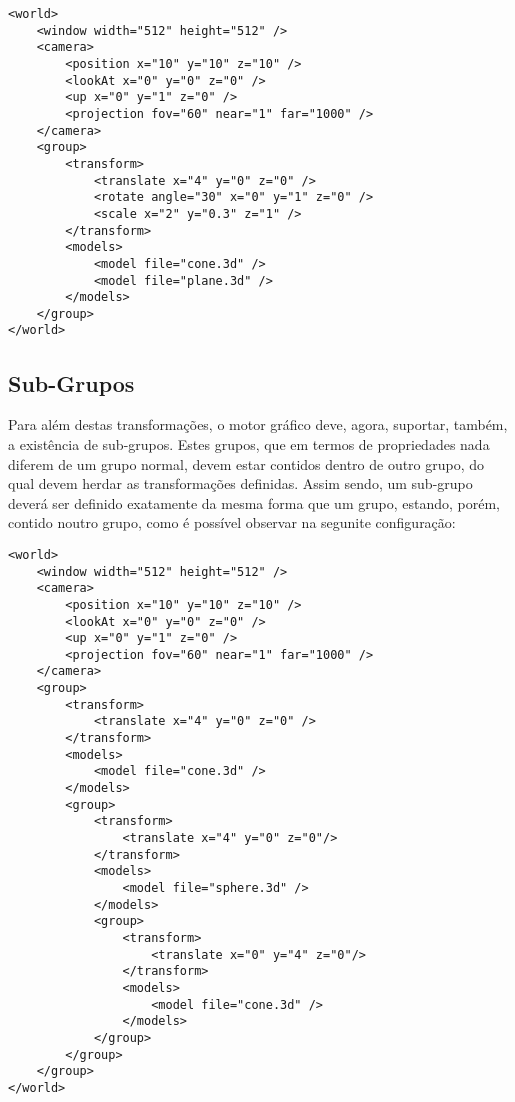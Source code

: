 \begin{tcolorbox}[
    colback=blue!10!white,
    colframe=black!50!black,
    after upper={\hfill\textbf{xml}}
]
\begin{verbatim}
<world>
    <window width="512" height="512" />
    <camera>
        <position x="10" y="10" z="10" />
        <lookAt x="0" y="0" z="0" />
        <up x="0" y="1" z="0" />
        <projection fov="60" near="1" far="1000" />
    </camera>
    <group>
        <transform>
            <translate x="4" y="0" z="0" />
            <rotate angle="30" x="0" y="1" z="0" />
            <scale x="2" y="0.3" z="1" />
        </transform>
        <models>
            <model file="cone.3d" />
            <model file="plane.3d" />
        </models>
    </group>
</world>
\end{verbatim}
\end{tcolorbox}

\subsection{Sub-Grupos}
Para além destas transformações, o motor gráfico deve,
agora, suportar, também, a existência de sub-grupos.
\newline
\break
\noindent
Estes grupos, que em termos de propriedades nada diferem
de um grupo normal, devem estar contidos dentro
de outro grupo, do qual devem herdar as transformações
definidas.
\newline
\break
\noindent
Assim sendo, um sub-grupo deverá ser definido exatamente
da mesma forma que um grupo, estando, porém, contido
noutro grupo, como é possível observar na segunite
configuração:
\newline

\begin{tcolorbox}[
    colback=blue!10!white,
    colframe=black!50!black,
    after upper={\hfill\textbf{xml}}
]
\begin{verbatim}
<world>
    <window width="512" height="512" />
    <camera>
        <position x="10" y="10" z="10" />
        <lookAt x="0" y="0" z="0" />
        <up x="0" y="1" z="0" />
        <projection fov="60" near="1" far="1000" />
    </camera>
    <group>
        <transform>
            <translate x="4" y="0" z="0" />
        </transform>
        <models>
            <model file="cone.3d" />
        </models>
        <group>
            <transform>
                <translate x="4" y="0" z="0"/>
            </transform>
            <models>
                <model file="sphere.3d" />
            </models>
            <group>
                <transform>
                    <translate x="0" y="4" z="0"/>
                </transform>
                <models>
                    <model file="cone.3d" />
                </models>
            </group>
        </group>
    </group>
</world>
\end{verbatim}
\end{tcolorbox}